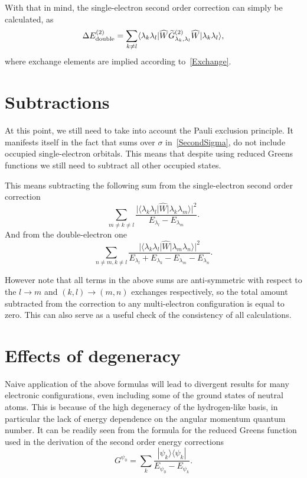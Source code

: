 With that in mind, the single-electron second order correction can simply be calculated, as
\begin{equation}\label{SecondDouble}
    \Delta E^{(2)}_{\rm{double}} = \sum_{k \neq l} \langle \lambda_k \lambda_l|\widehat{W} \widetilde{G}^{(2)}_{\lambda_k,\lambda_l} \widehat{W}|\lambda_k \lambda_l \rangle,
\end{equation}
where exchange elements are implied according to~\eqref{Exchange}.

\section{Subtractions}

At this point, we still need to take into account the Pauli exclusion principle. It manifests itself in the fact that sums over $\sigma$ in~\eqref{SecondSigma}, do not include occupied single-electron orbitals. This means that despite using reduced Greens functions we still need to subtract all other occupied states.

This means subtracting the following sum from the single-electron second order correction
\begin{equation}
  \sum_{m \neq k \neq l} \frac{|\langle \lambda_k \lambda_l|\widehat{W} |\lambda_k \lambda_m\rangle |^2}{E_{\lambda_l} - E_{\lambda_m}}.
\end{equation}
 And from the double-electron one
\begin{equation}
  \sum_{n \neq m,k \neq l} \frac{|\langle \lambda_k \lambda_l|\widehat{W} |\lambda_m \lambda_n\rangle |^2}{E_{\lambda_l}+E_{\lambda_k} - E_{\lambda_m} - E_{\lambda_n}}.
\end{equation}

However note that all terms in the above sums are anti-symmetric with respect to the $l \rightarrow m$ and $(k,l) \rightarrow (m,n)$ exchanges respectively, so the total amount subtracted from the correction to any multi-electron configuration is equal to zero. This can also serve as a useful check of the consistency of all calculations.

\section{Effects of degeneracy}

Naive application of the above formulas will lead to divergent results for many electronic configurations, even including some of the ground states of neutral atoms. This is because of the high degeneracy of the hydrogen-like basis, in particular the lack of energy dependence on the angular momentum quantum number. It can be readily seen from the formula for the reduced Greens function used in the derivation of the second order energy corrections
\begin{equation}
    G^{\psi_0}=\sum_k\frac{|\psi_k\rangle\langle\psi_k|}{E_{\psi_0}-E_{\psi_k}}.
\end{equation}

